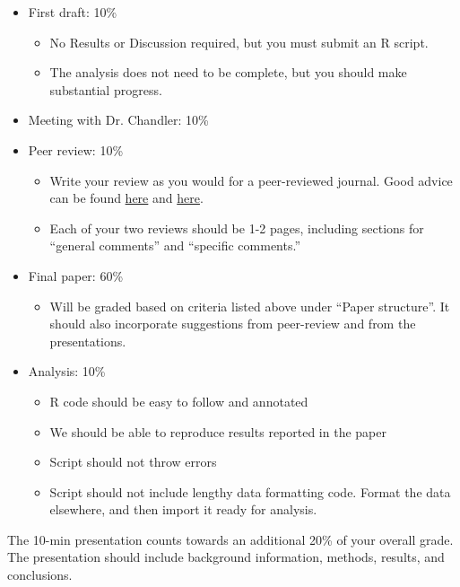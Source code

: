 \documentclass[12pt]{article}
\begin{document}
\begin{itemize}
  \item First draft: 10\%
    \begin{itemize}
      \item No Results or Discussion required, but you must submit an R script.
      \item The analysis does not need to be complete, but you should make substantial progress.
      \end{itemize}
  \item Meeting with Dr. Chandler: 10\%
  \item Peer review: 10\%
    \begin{itemize}
      \item Write your review as you would for a peer-reviewed journal. Good advice can be found \textcolor{blue}{\href{https://www.britishecologicalsociety.org/wp-content/uploads/2017/06/BES-Peer-Review-Guide-2017_web.pdf}{here}} and \textcolor{blue}{\href{https://www.nature.com/articles/d41586-018-06991-0}{here}}.
      \item Each of your two reviews should be 1-2 pages, including sections for ``general comments'' and ``specific comments.''
    \end{itemize}
  \item Final paper: 60\%
    \begin{itemize}
      \item Will be graded based on criteria listed above under
        ``Paper structure''. It should also incorporate suggestions from
        peer-review and from the presentations.
    \end{itemize}
  \item Analysis: 10\%
    \begin{itemize}
      \item R code should be easy to follow and annotated
      \item We should be able to reproduce results reported in the paper
      \item Script should not throw errors
      \item Script should not include lengthy data formatting code. Format the data elsewhere, and then import it ready for analysis.
    \end{itemize}
\end{itemize}

The 10-min presentation counts towards an additional 20\% of your
overall grade. The presentation should include background information,
methods, results, and conclusions.   
\end{document}
